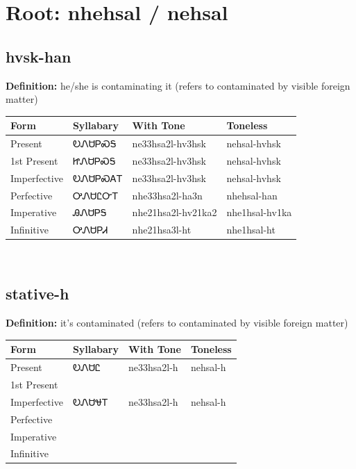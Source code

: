 \documentclass{article}%
\begin{document}
%
\normalsize%
\section*{Root: nhehsal / nehsal}%
\subsection*{hvsk-han}%
\textbf{Definition: }%
he/she is contaminating it (refers to contaminated by visible foreign matter)%
\\[0.5em]%
\begin{tabular}{|l|l|l|l|}%
\hline%
\textbf{Form}&\textbf{Syllabary}&\textbf{With Tone}&\textbf{Toneless}\\%
\hline%
Present&ᎧᏁᏌᏢᏍᎦ&ne33hsa2l{-}hv3hsk&nehsal{-}hvhsk\\%
1st Present&ᏥᏁᏌᏢᏍᎦ&ne33hsa2l{-}hv3hsk&nehsal{-}hvhsk\\%
Imperfective&ᎧᏁᏌᏢᏍᎪᎢ&ne33hsa2l{-}hv3hsk&nehsal{-}hvhsk\\%
Perfective&ᎤᏁᏌᏝᏅᎢ&nhe33hsa2l{-}ha3n&nhehsal{-}han\\%
Imperative&ᎯᏁᏌᏢᎦ&nhe21hsa2l{-}hv21ka2&nhe1hsal{-}hv1ka\\%
Infinitive&ᎤᏁᏌᏢᏗ&nhe21hsa3l{-}ht&nhe1hsal{-}ht\\%
\hline%
\end{tabular}%
\\[1em]%
\subsection*{stative-h}%
\textbf{Definition: }%
it’s contaminated (refers to contaminated by visible foreign matter)%
\\[0.5em]%
\begin{tabular}{|l|l|l|l|}%
\hline%
\textbf{Form}&\textbf{Syllabary}&\textbf{With Tone}&\textbf{Toneless}\\%
\hline%
Present&ᎧᏁᏌᏝ&ne33hsa2l{-}h&nehsal{-}h\\%
1st Present&&&\\%
Imperfective&ᎧᏁᏌᏠᎢ&ne33hsa2l{-}h&nehsal{-}h\\%
Perfective&&&\\%
Imperative&&&\\%
Infinitive&&&\\%
\hline%
\end{tabular}%
\\[1em]%
\end{document}
